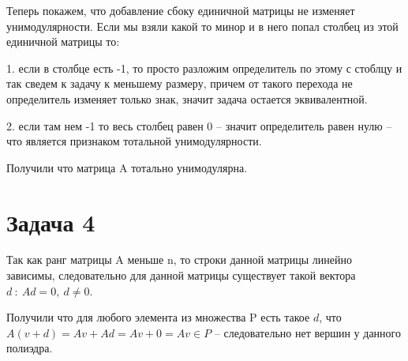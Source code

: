 \documentclass{article}
\begin{document}
Теперь покажем, что добавление сбоку единичной матрицы не изменяет унимодулярности.
Если мы взяли какой то минор и в него попал столбец из этой единичной матрицы то:

1. если в столбце есть -1, то просто разложим определитель по этому с стоблцу и так сведем к задачу к меньшему размеру, причем от такого перехода не определитель изменяет только знак, значит задача остается эквивалентной.

2. если там нем -1 то весь столбец равен 0 -- значит определитель равен нулю -- что является признаком тотальной унимодулярности.

Получили что матрица A тотально унимодулярна.

\section{Задача 4}

Так как ранг матрицы A меньше n, то строки данной матрицы линейно зависимы, следовательно для данной матрицы существует такой вектора $d\ :\ Ad = 0,\ d \neq 0$.

Получили что для любого элемента из множества P есть такое $d$, что $A(v+d) = Av + Ad = Av + 0 = Av \in P$ -- следовательно нет вершин у данного полиэдра.
\end{document}
